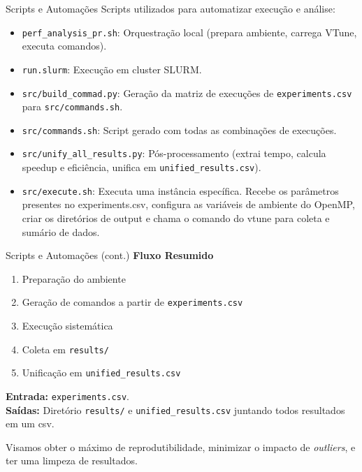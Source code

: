 \documentclass{beamer}
\begin{document}
\begin{frame}{Scripts e Automações}
    Scripts utilizados para automatizar execução e análise:
    \begin{itemize}
        \item \texttt{perf\_analysis\_pr.sh}: Orquestração local (prepara ambiente, carrega VTune, executa comandos).
        \item \texttt{run.slurm}: Execução em cluster SLURM.
        \item \texttt{src/build\_commad.py}: Geração da matriz de execuções de \texttt{experiments.csv} para \texttt{src/commands.sh}.
        \item \texttt{src/commands.sh}: Script gerado com todas as combinações de execuções.
        \item \texttt{src/unify\_all\_results.py}: Pós-processamento (extrai tempo, calcula speedup e eficiência, unifica em \texttt{unified\_results.csv}).
        \item \texttt{src/execute\bench.sh}: Executa uma instância específica. Recebe os parâmetros presentes no experiments.csv, configura as variáveis de ambiente do OpenMP, criar os diretórios de output e chama o comando do vtune para coleta e sumário de dados.
    \end{itemize}
\end{frame}

\begin{frame}{Scripts e Automações (cont.)}
    \textbf{Fluxo Resumido}
    \begin{enumerate}
        \item Preparação do ambiente
        \item Geração de comandos a partir de \texttt{experiments.csv}
        \item Execução sistemática
        \item Coleta em \texttt{results/}
        \item Unificação em \texttt{unified\_results.csv}
    \end{enumerate}

    \textbf{Entrada:} \texttt{experiments.csv}.\\
    \textbf{Saídas:} Diretório \texttt{results/} e \texttt{unified\_results.csv} juntando todos resultados em um csv.
    
    Visamos obter o máximo de reprodutibilidade, minimizar o impacto de \textit{outliers}, e ter uma limpeza de resultados.
\end{frame}
\end{document}
